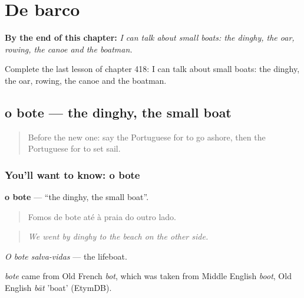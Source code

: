 
\chapter{De barco}
\label{ch:pt-de-barco}

\begin{chapteropening}
\textbf{By the end of this chapter:} \emph{I can talk about small boats: the dinghy, the oar, rowing, the canoe and the boatman.}

Complete the last lesson of chapter 418: I can talk about small boats: the dinghy, the oar, rowing, the canoe and the boatman.
\end{chapteropening}

\section[o bote]{o bote — the dinghy, the small boat}

\label{lesson:PT-C418-bote}



\begin{quote}
Before the new one: say the Portuguese for to go ashore, then the Portuguese for to set sail.
\end{quote}

\subsection*{You'll want to know: o bote}
\textbf{o bote} — \textquotedblleft{}the dinghy, the small boat\textquotedblright{}.

\begin{quote}
Fomos de bote até à praia do outro lado.
\end{quote}

\begin{quote}
\emph{We went by dinghy to the beach on the other side.}
\end{quote}

\emph{O bote salva-vidas} — the lifeboat.

\begin{cousinweb}
\emph{bote} came from Old French \emph{bot}, which was taken from Middle English \emph{boot}, Old English \emph{bāt} 'boat' (EtymDB).
\end{cousinweb}

